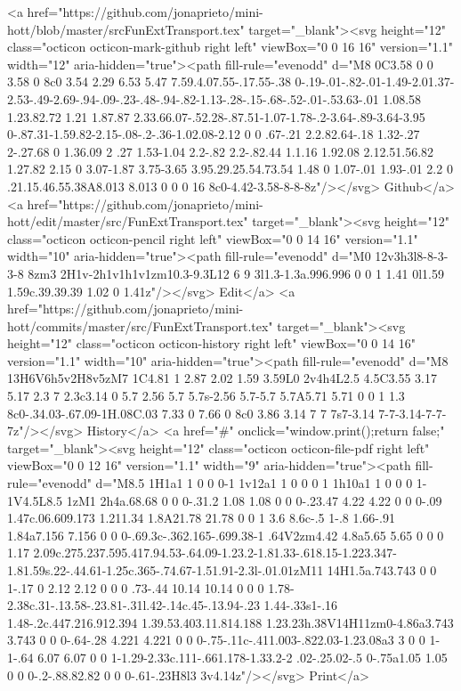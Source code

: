      <a href="https://github.com/jonaprieto/mini-hott/blob/master/srcFunExtTransport.tex" target="_blank"><svg height="12" class="octicon octicon-mark-github right left" viewBox="0 0 16 16" version="1.1" width="12" aria-hidden="true"><path fill-rule="evenodd" d="M8 0C3.58 0 0 3.58 0 8c0 3.54 2.29 6.53 5.47 7.59.4.07.55-.17.55-.38 0-.19-.01-.82-.01-1.49-2.01.37-2.53-.49-2.69-.94-.09-.23-.48-.94-.82-1.13-.28-.15-.68-.52-.01-.53.63-.01 1.08.58 1.23.82.72 1.21 1.87.87 2.33.66.07-.52.28-.87.51-1.07-1.78-.2-3.64-.89-3.64-3.95 0-.87.31-1.59.82-2.15-.08-.2-.36-1.02.08-2.12 0 0 .67-.21 2.2.82.64-.18 1.32-.27 2-.27.68 0 1.36.09 2 .27 1.53-1.04 2.2-.82 2.2-.82.44 1.1.16 1.92.08 2.12.51.56.82 1.27.82 2.15 0 3.07-1.87 3.75-3.65 3.95.29.25.54.73.54 1.48 0 1.07-.01 1.93-.01 2.2 0 .21.15.46.55.38A8.013 8.013 0 0 0 16 8c0-4.42-3.58-8-8-8z"/></svg> Github</a>
      <a href="https://github.com/jonaprieto/mini-hott/edit/master/src/FunExtTransport.tex" target="_blank"><svg height="12" class="octicon octicon-pencil right left" viewBox="0 0 14 16" version="1.1" width="10" aria-hidden="true"><path fill-rule="evenodd" d="M0 12v3h3l8-8-3-3-8 8zm3 2H1v-2h1v1h1v1zm10.3-9.3L12 6 9 3l1.3-1.3a.996.996 0 0 1 1.41 0l1.59 1.59c.39.39.39 1.02 0 1.41z"/></svg> Edit</a>
      <a href="https://github.com/jonaprieto/mini-hott/commits/master/src/FunExtTransport.tex" target="_blank"><svg height="12" class="octicon octicon-history right left" viewBox="0 0 14 16" version="1.1" width="10" aria-hidden="true"><path fill-rule="evenodd" d="M8 13H6V6h5v2H8v5zM7 1C4.81 1 2.87 2.02 1.59 3.59L0 2v4h4L2.5 4.5C3.55 3.17 5.17 2.3 7 2.3c3.14 0 5.7 2.56 5.7 5.7s-2.56 5.7-5.7 5.7A5.71 5.71 0 0 1 1.3 8c0-.34.03-.67.09-1H.08C.03 7.33 0 7.66 0 8c0 3.86 3.14 7 7 7s7-3.14 7-7-3.14-7-7-7z"/></svg> History</a>
      <a  href="#" onclick="window.print();return false;" target="_blank"><svg height="12" class="octicon octicon-file-pdf right left" viewBox="0 0 12 16" version="1.1" width="9" aria-hidden="true"><path fill-rule="evenodd" d="M8.5 1H1a1 1 0 0 0-1 1v12a1 1 0 0 0 1 1h10a1 1 0 0 0 1-1V4.5L8.5 1zM1 2h4a.68.68 0 0 0-.31.2 1.08 1.08 0 0 0-.23.47 4.22 4.22 0 0 0-.09 1.47c.06.609.173 1.211.34 1.8A21.78 21.78 0 0 1 3.6 8.6c-.5 1-.8 1.66-.91 1.84a7.156 7.156 0 0 0-.69.3c-.362.165-.699.38-1 .64V2zm4.42 4.8a5.65 5.65 0 0 0 1.17 2.09c.275.237.595.417.94.53-.64.09-1.23.2-1.81.33-.618.15-1.223.347-1.81.59s.22-.44.61-1.25c.365-.74.67-1.51.91-2.3l-.01.01zM11 14H1.5a.743.743 0 0 1-.17 0 2.12 2.12 0 0 0 .73-.44 10.14 10.14 0 0 0 1.78-2.38c.31-.13.58-.23.81-.31l.42-.14c.45-.13.94-.23 1.44-.33s1-.16 1.48-.2c.447.216.912.394 1.39.53.403.11.814.188 1.23.23h.38V14H11zm0-4.86a3.743 3.743 0 0 0-.64-.28 4.221 4.221 0 0 0-.75-.11c-.411.003-.822.03-1.23.08a3 3 0 0 1-1-.64 6.07 6.07 0 0 1-1.29-2.33c.111-.661.178-1.33.2-2 .02-.25.02-.5 0-.75a1.05 1.05 0 0 0-.2-.88.82.82 0 0 0-.61-.23H8l3 3v4.14z"/></svg> Print</a>
